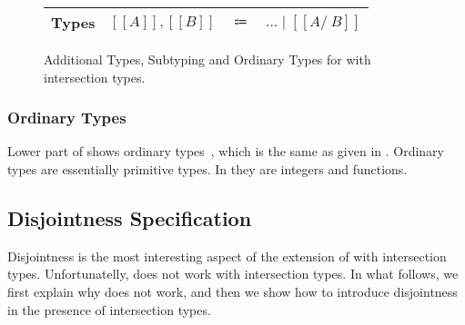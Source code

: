 \begin{figure}[t]
    \centering
    \begin{tabular}{lrcl} \toprule
      Types & $[[A]], [[B]]$ & $\Coloneqq$ & $ ... \mid [[A /\ B]] $ \\
      \bottomrule
    \end{tabular}
    \centering
    \centering
  \caption{Additional Types, Subtyping and Ordinary Types for \cal with intersection types.}
  \label{fig:inter:system}
\end{figure}

\subsubsection*{Ordinary Types}
Lower part of
 shows ordinary types~\cite{davies2000intersection}, 
which is the same as given in .
Ordinary types are essentially primitive types. In \cal they
are integers and functions. 

\subsection{Disjointness Specification}
\label{sec:inter:disj}
Disjointness is the most interesting aspect of the extension of \cal with
intersection types. Unfortunatelly,  does not work with intersection
types. In what follows, we first explain why  does not work, and then
we show how to introduce disjointness in the presence of intersection types. 

